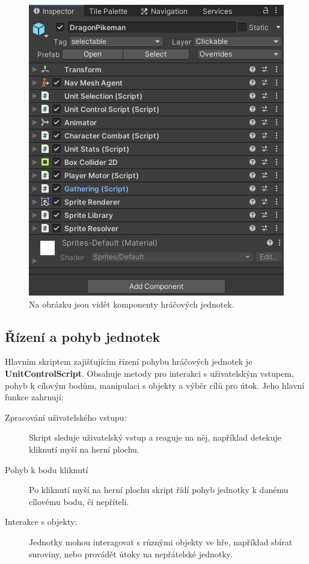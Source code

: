 \begin{figure}[H]
	\centering
	\includegraphics[scale=1]{obrazky-figures/PlayerComponents.png}
	\caption{Na obrázku jsou vidět komponenty hráčových jednotek.}
	\label{PlayerScripts}
\end{figure}

\subsection{Řízení a pohyb jednotek}
Hlavním skriptem zajišťujícím řízení pohybu hráčových jednotek je \textbf{UnitControlScript}. Obsahuje metody pro interakci s uživatelským vstupem, pohyb k cílovým bodům, manipulaci s objekty a výběr cílů pro útok. Jeho hlavní funkce zahrnují:

\begin{description}
	\item [Zpracování uživatelského vstupu:] Skript sleduje uživatelský vstup a reaguje na něj, například detekuje kliknutí myší na herní plochu.
	\item [Pohyb k bodu kliknutí] Po kliknutí myší na herní plochu skript řídí pohyb jednotky k danému cílovému bodu, či nepříteli.
	\item [Interakce s objekty:] Jednotky mohou interagovat s různými objekty ve hře, například sbírat suroviny, nebo provádět útoky na nepřátelské jednotky.
\end{description}

